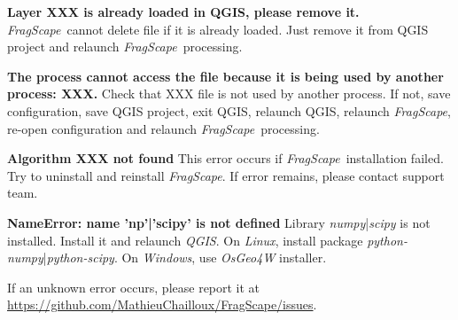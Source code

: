 \documentclass[11pt]{article}
\newcommand{\tool}{\emph{FragScape}}
\newcommand{\qgis}{\emph{QGIS}}
\let\tempone\itemize
\let\temptwo\enditemize
\renewenvironment{itemize}{\tempone\addtolength{\itemsep}{-0.5\baselineskip}}{\temptwo}
\begin{document}
\begin{itemize}
    \item \textbf{\color{red}Layer XXX is already loaded in QGIS, please remove it.} \tool\  cannot delete file if it is already loaded. Just remove it from QGIS project and relaunch \tool\ processing.
    \item \textbf{\color{red}The process cannot access the file because it is being used by another process: XXX.} Check that XXX file is not used by another process. If not, save configuration, save QGIS project, exit QGIS, relaunch QGIS, relaunch \tool, re-open configuration and relaunch \tool\ processing.
    \item \textbf{\color{red}Algorithm XXX not found} This error occurs if \tool\ installation failed. Try to uninstall and reinstall \tool. If error remains, please contact support team.
    \item \textbf{\color{red}NameError: name 'np'|'scipy' is not defined}
    Library \emph{numpy}|\emph{scipy} is not installed. Install it and relaunch \qgis. On \emph{Linux}, install package \emph{python-numpy}|\emph{python-scipy}. On \emph{Windows}, use \emph{OsGeo4W} installer.
\end{itemize}

If an unknown error occurs, please report it at \url{https://github.com/MathieuChailloux/FragScape/issues}.

\textbf{\color{red}}




\printbibliography
\end{document}
